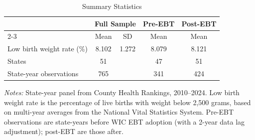 \begin{table}[htbp]
\centering
\caption{Summary Statistics}
\label{tab:summary}
\begin{tabular}{lcccc}
\hline\hline
 & \multicolumn{2}{c}{Full Sample} & Pre-EBT & Post-EBT \\
\cmidrule(lr){2-3}
 & Mean & SD & Mean & Mean \\
\hline
Low birth weight rate (\%) & 8.102 & 1.272 & 8.079 & 8.121 \\
States & 51 & & 47 & 51 \\
State-year observations & 765 & & 341 & 424 \\
\hline\hline
\end{tabular}
\begin{tablenotes}[flushleft]
\small
\item \textit{Notes:} State-year panel from County Health Rankings, 2010--2024. Low birth weight rate is the percentage of live births with weight below 2,500 grams, based on multi-year averages from the National Vital Statistics System. Pre-EBT observations are state-years before WIC EBT adoption (with a 2-year data lag adjustment); post-EBT are those after.
\end{tablenotes}
\end{table}
